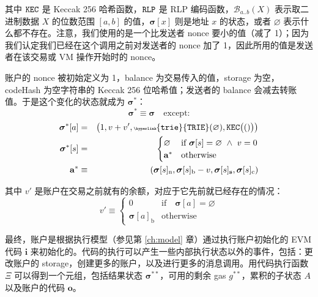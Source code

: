 \documentclass[9pt,oneside]{amsart}
\begin{document}
\begin{multicols}{2}
其中 $\mathtt{\tiny KEC}$ 是 Keccak 256 哈希函数，$\mathtt{\tiny RLP}$ 是 RLP 编码函数，$\mathcal{B}_{a..b}(X)$ 表示取二进制数据 $X$ 的位数范围 $[a, b]$ 的值，$\boldsymbol{\sigma}[x]$ 则是地址 $x$ 的状态，或者 $\varnothing$ 表示什么都不存在。注意，我们使用的是一个比发送者 nonce 要小的值（减了 1）；因为我们认定我们已经在这个调用之前对发送者的 nonce 加了 1，因此所用的值是发送者在该交易或 VM 操作开始时的 nonce。

账户的 nonce 被初始定义为 1，balance 为交易传入的值，storage 为空，codeHash 为空字符串的 Keccak 256 位哈希值；发送者的 balance 会减去转账值。于是这个变化的状态就成为 $\boldsymbol{\sigma}^*$：
\begin{equation}
\boldsymbol{\sigma}^* \equiv \boldsymbol{\sigma} \quad \text{except:}
\end{equation}
\begin{eqnarray}
\boldsymbol{\sigma}^*[a] &=& \big( 1, v + v', \mathtt{\tiny \hyperlink{trie}{TRIE}}(\varnothing), \mathtt{\tiny KEC}\big(()\big) \big) \\
\boldsymbol{\sigma}^*[s] &=& \begin{cases}
\varnothing & \text{if}\ \boldsymbol{\sigma}[s] = \varnothing \ \wedge\ v = 0 \\
\mathbf{a}^* & \text{otherwise}
\end{cases} \\
\mathbf{a}^* &\equiv& (\boldsymbol{\sigma}[s]_{\mathrm{n}}, \boldsymbol{\sigma}[s]_{\mathrm{b}} - v, \boldsymbol{\sigma}[s]_{\mathbf{s}}, \boldsymbol{\sigma}[s]_{\mathrm{c}})
\end{eqnarray}

其中 $v'$ 是账户在交易之前就有的余额，对应于它先前就已经存在的情况：
\begin{equation}
v' \equiv \begin{cases}
0 & \text{if} \quad \boldsymbol{\sigma}[a] = \varnothing\\
\boldsymbol{\sigma}[a]_{\mathrm{b}} & \text{otherwise}
\end{cases}
\end{equation}


最终，账户是根据执行模型（参见第 \ref{ch:model} 章）通过执行账户初始化的 EVM 代码 $\mathbf{i}$ 来初始化的。代码的执行可以产生一些内部执行状态以外的事件，包括：更改账户的 storage，创建更多的账户，以及进行更多的消息调用。用代码执行函数 $\Xi$ 可以得到一个元组，包括结果状态 $\boldsymbol{\sigma}^{**}$，可用的剩余 gas $g^{**}$，累积的子状态 $A$ 以及账户的代码 $\mathbf{o}$。


\end{multicols}
\end{document}
